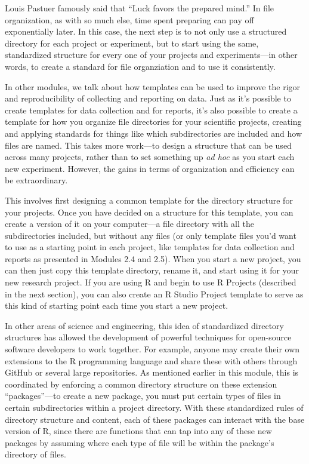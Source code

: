 \documentclass[]{tufte-book}
\begin{document}
Louis Pastuer famously said that ``Luck favors the prepared mind.'' In file
organization, as with so much else, time spent preparing can pay off
exponentially later. In this case, the next step is to not only use a structured
directory for each project or experiment, but to start using the same,
standardized structure for every one of your projects and experiments---in other
words, to create a standard for file organziation and to use it consistently.

In other modules, we talk about how templates can be used to improve the rigor
and reproducibility of collecting and reporting on data. Just as it's possible
to create templates for data collection and for reports, it's also possible to
create a template for how you organize file directories for your scientific
projects, creating and applying standards for things like which subdirectories
are included and how files are named. This takes more work---to design a
structure that can be used across many projects, rather than to set something
up \emph{ad hoc} as you start each new experiment. However, the gains in terms of
organization and efficiency can be extraordinary.

This involves first designing a common template for the directory structure for
your projects. Once you have decided on a structure for this template, you can
create a version of it on your computer---a file directory with all the
subdirectories included, but without any files (or only template files you'd
want to use as a starting point in each project, like templates for data
collection and reports as presented in Modules 2.4 and 2.5). When you start a
new project, you can then just copy this template directory, rename it, and
start using it for your new research project. If you are using R and begin to
use R Projects (described in the next section), you can also create an R Studio
Project template to serve as this kind of starting point each time you start a
new project.

In other areas of science and engineering, this idea of standardized directory
structures has allowed the development of powerful techniques for open-source
software developers to work together. For example, anyone may create their own
extensions to the R programming language and share these with others through
GitHub or several large repositories. As mentioned earlier in this
module, this is coordinated by enforcing a common directory structure on these
extension ``packages''---to create a new package, you must put certain types of
files in certain subdirectories within a project directory. With these
standardized rules of directory structure and content, each of these packages
can interact with the base version of R, since there are functions that can tap
into any of these new packages by assuming where each type of file will be
within the package's directory of files.
\end{document}
